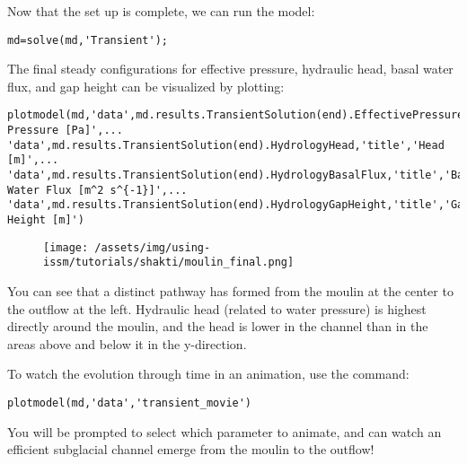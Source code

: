 Now that the set up is complete, we can run the model:
\begin{verbatim}md=solve(md,'Transient');\end{verbatim}

The final steady configurations for effective pressure, hydraulic head, basal water flux, and gap height can be visualized by plotting:
\begin{verbatim}plotmodel(md,'data',md.results.TransientSolution(end).EffectivePressure,'title','Effective Pressure [Pa]',...
'data',md.results.TransientSolution(end).HydrologyHead,'title','Head [m]',...
'data',md.results.TransientSolution(end).HydrologyBasalFlux,'title','Basal Water Flux [m^2 s^{-1}]',...
'data',md.results.TransientSolution(end).HydrologyGapHeight,'title','Gap Height [m]')\end{verbatim}

\begin{figure}[H]
	\begin{center}
		\texttt{[image: /assets/img/using-issm/tutorials/shakti/moulin\_final.png]}
	\end{center}
\end{figure}

You can see that a distinct pathway has formed from the moulin at the center to the outflow at the left. Hydraulic head (related to water pressure) is highest directly around the moulin, and the head is lower in the channel than in the areas above and below it in the y-direction. 

To watch the evolution through time in an animation, use the command: 
\begin{verbatim}plotmodel(md,'data','transient_movie')\end{verbatim}

You will be prompted to select which parameter to animate, and can watch an efficient subglacial channel emerge from the moulin to the outflow!
